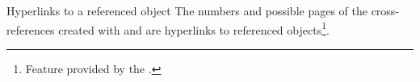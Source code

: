 \documentclass[english,nolocaltoc]{nwejmart}
\newtheorem[style=definition]{fact}
\newtheorem[title-plural=Criteria]{criterion}
\newtheorem[title=random experiment]{rexp}
\begin{document}
\begin{dbremark}{Hyperlinks to a referenced object}{}
  The numbers and  possible  pages of the
  cross-references created with  and 
 are hyperlinks to referenced objects\footnote{Feature provided by the .}.
\end{dbremark}


%
%
\end{document}
